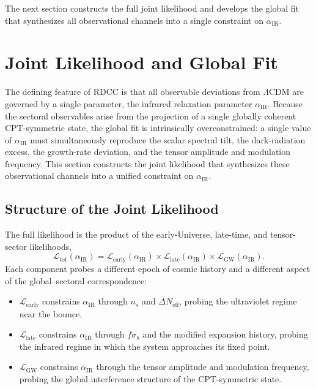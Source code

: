 \documentclass[11pt,a4paper]{article}
\begin{document}
The next section constructs the full joint likelihood and develops the global fit that synthesizes
all observational channels into a single constraint on $\alpha_{\mathrm{IR}}$.

\section{Joint Likelihood and Global Fit}

The defining feature of RDCC is that all observable deviations from $\Lambda$CDM are governed
by a single parameter, the infrared relaxation parameter $\alpha_{\mathrm{IR}}$. Because the sectoral
observables arise from the projection of a single globally coherent CPT-symmetric state, the
global fit is intrinsically overconstrained: a single value of $\alpha_{\mathrm{IR}}$ must simultaneously
reproduce the scalar spectral tilt, the dark-radiation excess, the growth-rate deviation, and the
tensor amplitude and modulation frequency. This section constructs the joint likelihood that
synthesizes these observational channels into a unified constraint on $\alpha_{\mathrm{IR}}$.

\subsection{Structure of the Joint Likelihood}

The full likelihood is the product of the early-Universe, late-time, and tensor-sector likelihoods,
\begin{equation}
    \mathcal{L}_{\mathrm{tot}}(\alpha_{\mathrm{IR}})
    = \mathcal{L}_{\mathrm{early}}(\alpha_{\mathrm{IR}})
      \times
      \mathcal{L}_{\mathrm{late}}(\alpha_{\mathrm{IR}})
      \times
      \mathcal{L}_{\mathrm{GW}}(\alpha_{\mathrm{IR}}).
\end{equation}
Each component probes a different epoch of cosmic history and a different aspect of the
global--sectoral correspondence:
\begin{itemize}
    \item $\mathcal{L}_{\mathrm{early}}$ constrains $\alpha_{\mathrm{IR}}$ through $n_s$ and $\Delta N_{\mathrm{eff}}$,
    probing the ultraviolet regime near the bounce.
    \item $\mathcal{L}_{\mathrm{late}}$ constrains $\alpha_{\mathrm{IR}}$ through $f\sigma_8$ and the modified
    expansion history, probing the infrared regime in which the system approaches its fixed point.
    \item $\mathcal{L}_{\mathrm{GW}}$ constrains $\alpha_{\mathrm{IR}}$ through the tensor amplitude and
    modulation frequency, probing the global interference structure of the CPT-symmetric state.
\end{itemize}
\end{document}
